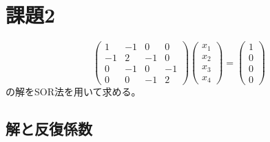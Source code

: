 \documentclass{jsarticle}
\begin{document}
\section{課題2}
\begin{equation}
  \left(
  \begin{array}{rrrr}
      1 & -1 & 0& 0\\
      -1 & 2 & -1 & 0\\
      0 & -1 & 0 & -1\\
      0 & 0 & -1 & 2 
  \end{array}
  \right)
  \left(
  \begin{array}{r}
      x_1\\
      x_2\\
      x_3\\
      x_4 
  \end{array}
  \right)
  =
  \left(
  \begin{array}{r}
      1\\
      0\\
      0\\
      0
  \end{array}
  \right)
\end{equation}
の解をSOR法を用いて求める。

\subsection{解と反復係数}
\end{document}
